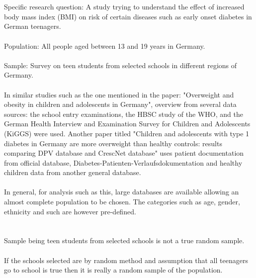 \documentclass[a4paper,12pt]{article}
\newcommand{\<}{\langle}
\renewcommand{\>}{\rangle}
\newcommand{\1}{\mathbbm{1}}
\begin{document}
\section{}

\section{}

Specific research question: A study trying to understand the effect of increased body mass index (BMI) on risk of certain diseases such as early onset diabetes in German teenagers. \\\\
Population: All people aged between 13 and 19 years in Germany. \\\\
Sample: Survey on teen students from selected schools in different regions of Germany. \\\\ 
In similar studies such as the one mentioned in the paper: "Overweight and obesity in children and adolescents in Germany", overview from several data sources: the school entry examinations, the HBSC study of the WHO, and the German Health Interview and Examination Survey for Children and Adolescents (KiGGS) were used.
Another paper titled "Children and adolescents with type 1 diabetes in Germany are more overweight than healthy controls: results comparing DPV database and CrescNet database" uses patient documentation from official database, Diabetes-Patienten-Verlaufsdokumentation and healthy children data from another general database.\\\\
In general, for analysis such as this, large databases are available allowing an almost complete population to be chosen. The categories such as age, gender, ethnicity and such are however pre-defined.
    

\section{}
Sample being teen students from selected schools is not a true random sample.\\\\
If the schools selected are by random method and assumption that all teenagers go to school is true then it is really a random sample of the population.

\section{}
\end{document}
